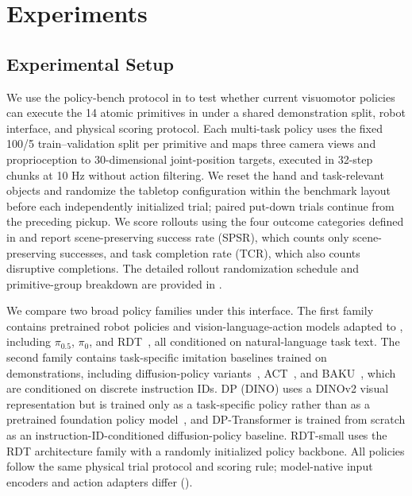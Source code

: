 \section{Experiments}
\label{sec:experiments}

\subsection{Experimental Setup}
\label{subsec:experiment_details}

We use the policy-bench protocol in  to test whether current visuomotor policies can execute the 14 atomic primitives in  under a shared demonstration split, robot interface, and physical scoring protocol. Each multi-task policy uses the fixed 100/5 train--validation split per primitive and maps three camera views and proprioception to 30-dimensional joint-position targets, executed in 32-step chunks at 10 Hz without action filtering. We reset the hand and task-relevant objects and randomize the tabletop configuration within the benchmark layout before each independently initialized trial; paired put-down trials continue from the preceding pickup. We score rollouts using the four outcome categories defined in  and report scene-preserving success rate (SPSR), which counts only scene-preserving successes, and task completion rate (TCR), which also counts disruptive completions. The detailed rollout randomization schedule and primitive-group breakdown are provided in .

We compare two broad policy families under this interface. The first family contains pretrained robot policies and vision-language-action models adapted to \ours{}, including $\pi_{0.5}$, $\pi_0$, and RDT~\citep{intelligence2025pi05visionlanguageactionmodelopenworld,black2024pi0,liu2025rdt1bdiffusionfoundationmodel}, all conditioned on natural-language task text. The second family contains task-specific imitation baselines trained on \ours{} demonstrations, including diffusion-policy variants~\citep{chi2023diffusionpolicy}, ACT~\citep{zhao2023learning}, and BAKU~\citep{haldar2024bakuefficienttransformermultitask}, which are conditioned on discrete instruction IDs. DP (DINO) uses a DINOv2 visual representation but is trained only as a task-specific policy rather than as a pretrained foundation policy model~\citep{oquab2023dinov2}, and DP-Transformer is trained from scratch as an instruction-ID-conditioned diffusion-policy baseline. RDT-small uses the RDT architecture family with a randomly initialized policy backbone. All policies follow the same physical trial protocol and scoring rule; model-native input encoders and action adapters differ ().



